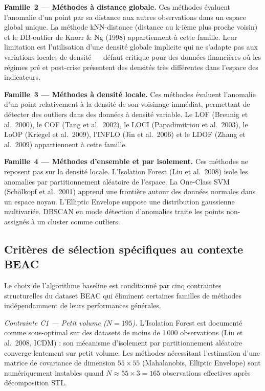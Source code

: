 \documentclass[12pt,a4paper]{article}
\begin{document}
\textbf{Famille~2 --- Méthodes à distance globale.} Ces méthodes évaluent
l'anomalie d'un point par sa distance aux autres observations dans un espace
global unique. La méthode kNN-distance (distance au k-ième plus proche voisin)
et le DB-outlier de Knorr \& Ng (1998) appartiennent à cette famille. Leur
limitation est l'utilisation d'une densité globale implicite qui ne s'adapte
pas aux variations locales de densité --- défaut critique pour des données
financières où les régimes pré et post-crise présentent des densités très
différentes dans l'espace des indicateurs.

\textbf{Famille~3 --- Méthodes à densité locale.} Ces méthodes évaluent
l'anomalie d'un point relativement à la densité de son voisinage immédiat,
permettant de détecter des outliers dans des données à densité variable. Le
LOF (Breunig et al.\ 2000), le COF (Tang et al.\ 2002), le LOCI (Papadimitriou
et al.\ 2003), le LoOP (Kriegel et al.\ 2009), l'INFLO (Jin et al.\ 2006)
et le LDOF (Zhang et al.\ 2009) appartiennent à cette famille.

\textbf{Famille~4 --- Méthodes d'ensemble et par isolement.} Ces méthodes
ne reposent pas sur la densité locale. L'Isolation Forest (Liu et al.\ 2008)
isole les anomalies par partitionnement aléatoire de l'espace. La One-Class
SVM (Schölkopf et al.\ 2001) apprend une frontière autour des données normales
dans un espace noyau. L'Elliptic Envelope suppose une distribution gaussienne
multivariée. DBSCAN en mode détection d'anomalies traite les points
non-assignés à un cluster comme outliers.

\subsection{Critères de sélection spécifiques au contexte BEAC}

Le choix de l'algorithme baseline est conditionné par cinq contraintes
structurelles du dataset BEAC qui éliminent certaines familles de méthodes
indépendamment de leurs performances générales.

\textit{Contrainte C1 --- Petit volume ($N = 195$).} L'Isolation Forest est
documenté comme sous-optimal sur des datasets de moins de 1\,000 observations
(Liu et al.\ 2008, ICDM) : son mécanisme d'isolement par partitionnement
aléatoire converge lentement sur petit volume. Les méthodes nécessitant
l'estimation d'une matrice de covariance de dimension $55 \times 55$
(Mahalanobis, Elliptic Envelope) sont numériquement instables quand
$N \approx 55 \times 3 = 165$ observations effectives après décomposition STL.
\end{document}
